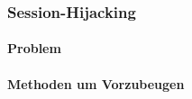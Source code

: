 \subsubsection{Session-Hijacking}
\label{sec:content_security_session-hijacking}
\paragraph{Problem}


\paragraph{Methoden um Vorzubeugen}
